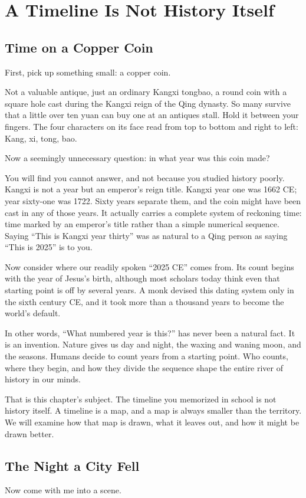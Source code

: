 \chapter{A Timeline Is Not History Itself}
\section{Time on a Copper Coin}
First, pick up something small: a copper coin.

Not a valuable antique, just an ordinary Kangxi tongbao, a round coin with a square hole cast during the Kangxi reign of the Qing dynasty. So many survive that a little over ten yuan can buy one at an antiques stall. Hold it between your fingers. The four characters on its face read from top to bottom and right to left: Kang, xi, tong, bao.

Now a seemingly unnecessary question: in what year was this coin made?

You will find you cannot answer, and not because you studied history poorly. Kangxi is not a year but an emperor's reign title. Kangxi year one was 1662 CE; year sixty-one was 1722. Sixty years separate them, and the coin might have been cast in any of those years. It actually carries a complete system of reckoning time: time marked by an emperor's title rather than a simple numerical sequence. Saying ``This is Kangxi year thirty'' was as natural to a Qing person as saying ``This is 2025'' is to you.

Now consider where our readily spoken ``2025 CE'' comes from. Its count begins with the year of Jesus's birth, although most scholars today think even that starting point is off by several years. A monk devised this dating system only in the sixth century CE, and it took more than a thousand years to become the world's default.

In other words, ``What numbered year is this?'' has never been a natural fact. It is an invention. Nature gives us day and night, the waxing and waning moon, and the seasons. Humans decide to count years from a starting point. Who counts, where they begin, and how they divide the sequence shape the entire river of history in our minds.

That is this chapter's subject. The timeline you memorized in school is not history itself. A timeline is a map, and a map is always smaller than the territory. We will examine how that map is drawn, what it leaves out, and how it might be drawn better.

\section{The Night a City Fell}
Now come with me into a scene.

